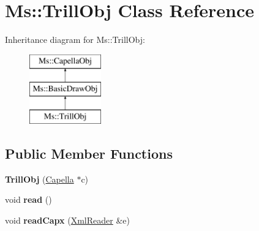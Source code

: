 \hypertarget{class_ms_1_1_trill_obj}{}\section{Ms\+:\+:Trill\+Obj Class Reference}
\label{class_ms_1_1_trill_obj}
Inheritance diagram for Ms\+:\+:Trill\+Obj\+:\begin{figure}[H]
\begin{center}
\leavevmode
\includegraphics[height=3.000000cm]{class_ms_1_1_trill_obj}
\end{center}
\end{figure}
\subsection*{Public Member Functions}
\begin{DoxyCompactItemize}
\item 
\mbox{\label{class_ms_1_1_trill_obj_ab840e0715a308b1edfe36675d5e6c3e8}} 
{\bfseries Trill\+Obj} (\hyperlink{class_ms_1_1_capella}{Capella} $\ast$c)
\item 
\mbox{\label{class_ms_1_1_trill_obj_ac631da30174afae047e6a199862e41a0}} 
void {\bfseries read} ()
\item 
\mbox{\label{class_ms_1_1_trill_obj_a3ecd75a0575f9650cbec66c83e1cedf2}} 
void {\bfseries read\+Capx} (\hyperlink{class_ms_1_1_xml_reader}{Xml\+Reader} \&e)
\end{DoxyCompactItemize}
